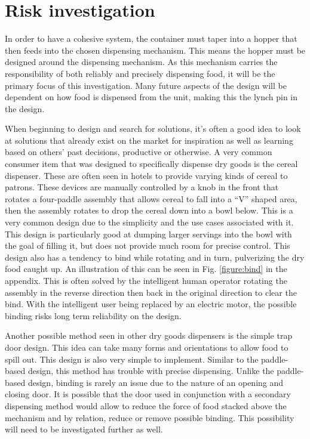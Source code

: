 \documentclass[12pt]{article}
\begin{document}
\section{Risk investigation}
    In order to have a cohesive system, the container must taper into a hopper that then feeds into the chosen dispensing mechanism. This means the hopper must be designed around the dispensing mechanism. As this mechanism carries the responsibility of both reliably and precisely dispensing food, it will be the primary focus of this investigation. Many future aspects of the design will be dependent on how food is dispensed from the unit, making this the lynch pin in the design.

When beginning to design and search for solutions, it’s often a good idea to look at solutions that already exist on the market for inspiration as well as learning based on others’ past decisions, productive or otherwise. A very common consumer item that was designed to specifically dispense dry goods is the cereal dispenser. These are often seen in hotels to provide varying kinds of cereal to patrons. These devices are manually controlled by a knob in the front that rotates a four-paddle
assembly that allows cereal to fall into a “V” shaped area, then the assembly rotates to drop the cereal down into a bowl below. This is a very common design due to the simplicity and the use cases associated with it. This design is particularly good at dumping larger servings into the bowl with the goal of filling it, but does not provide much room for precise control. This design also has a tendency to bind while rotating and in turn, pulverizing the dry food caught up. An illustration of this
can be seen in Fig. \ref{figure:bind}  in the appendix. This is often solved by the intelligent human operator rotating the assembly in the reverse direction then back in the original direction to clear the bind. With the intelligent user being replaced by an electric motor, the possible binding risks long term reliability on the design.

Another possible method seen in other dry goods dispensers is the simple trap door design. This idea can take many forms and orientations to allow food to spill out. This design is also very simple to implement. Similar to the paddle-based design, this method has trouble with precise dispensing. Unlike the paddle-based design, binding is rarely an issue due to the nature of an opening and closing door. It is possible that the door used in conjunction with a secondary dispensing method would allow to reduce the force of food stacked above the mechanism and by relation, reduce or remove possible binding. This possibility will need to be investigated further as well.
\end{document}
